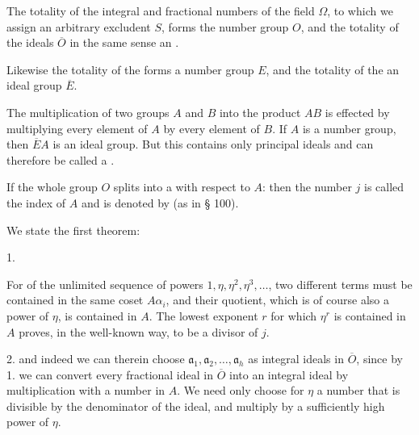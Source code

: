 
The totality of the integral and fractional numbers of the field $\Omega$, to
which we assign an arbitrary excludent $S$, forms the number group $O$, and the
totality of the ideals $\overline{O}$ in the same sense an .

Likewise the totality of the  forms a number group $E$, and the
totality of the  an ideal group $\overline{E}$.

The multiplication of two groups $A$ and $B$ into the product $AB$ is effected
by multiplying every element of $A$ by every element of $B$. If $A$ is a number
group, then $\overline{E}A$ is an ideal group. But this contains only principal
ideals and can therefore be called a .

If the whole group $O$ splits into a  with
respect to $A$:
then the number $j$ is called the index of $A$ and is denoted by
(as in § 100).

We state the first theorem:

1. 

For of the unlimited sequence of powers $1, \eta, \eta^2, \eta^3, \dots$, two
different terms must be contained in the same coset $A\alpha_i$, and
their quotient, which is of course also a power of $\eta$, is contained in $A$.
The lowest exponent $r$ for which $\eta^r$ is contained in $A$ proves, in the
well-known way, to be a divisor of $j$.

2. 
and indeed we can therein choose $\mathfrak{a}_1, \mathfrak{a}_2, \dots,
\mathfrak{a}_h$ as integral ideals in $\overline{O}$, since by 1. we can
convert every fractional ideal in $\overline{O}$ into an integral ideal by
multiplication with a number in $A$. We need only choose for $\eta$ a number
that is divisible by the denominator of the ideal, and multiply by a
sufficiently high power of $\eta$.
